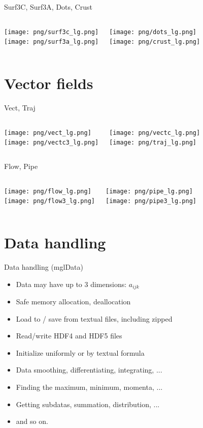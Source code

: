 \documentclass[color=usenames]{beamer}
\begin{document}
\begin{frame}{Surf3C, Surf3A, Dots, Crust}
\begin{columns}
\texttt{[image: png/surf3c\_lg.png]}\\
\texttt{[image: png/surf3a\_lg.png]}

\texttt{[image: png/dots\_lg.png]}\\
\texttt{[image: png/crust\_lg.png]}

\end{columns}
\end{frame}


\section{Vector fields}

\begin{frame}{Vect, Traj}
\begin{columns}
\texttt{[image: png/vect\_lg.png]}\\
\texttt{[image: png/vectc3\_lg.png]}

\texttt{[image: png/vectc\_lg.png]}\\
\texttt{[image: png/traj\_lg.png]}

\end{columns}
\end{frame}

\begin{frame}{Flow, Pipe}
\begin{columns}
\texttt{[image: png/flow\_lg.png]}\\
\texttt{[image: png/flow3\_lg.png]}

\texttt{[image: png/pipe\_lg.png]}\\
\texttt{[image: png/pipe3\_lg.png]}

\end{columns}
\end{frame}


\section{Data handling}
\begin{frame}{Data handling (mglData)}
\Large
\begin{itemize}
\item Data may have up to 3 dimensions: $a_{ijk}$
\item Safe memory allocation, deallocation
\item Load to / save from textual files, including zipped
\item Read/write HDF4 and HDF5 files
\item Initialize uniformly or by textual formula
\item Data smoothing, differentiating, integrating, ...
\item Finding the maximum, minimum, momenta, ...
\item Getting subdatas, summation, distribution, ...
\item and so on.
\end{itemize}
\end{frame}
\end{document}

